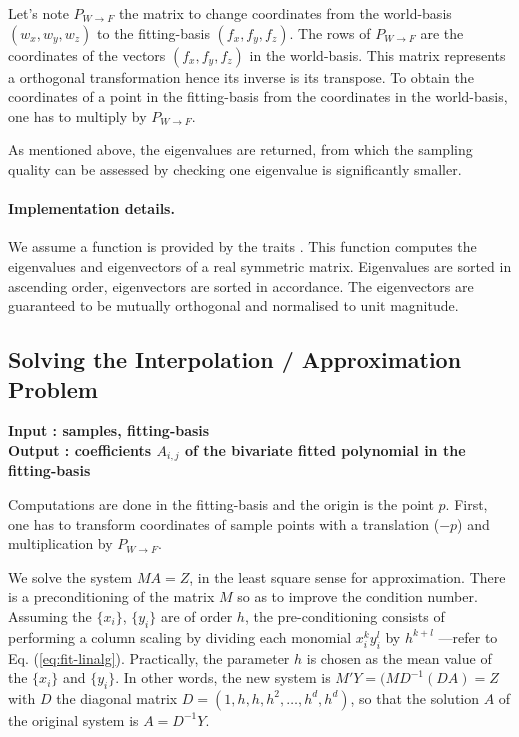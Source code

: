 Let's note $P_{W\rightarrow F}$ the matrix to change coordinates from the
world-basis $(w_x,w_y,w_z)$ to the fitting-basis $(f_x,f_y,f_z)$. The
rows of $P_{W\rightarrow F}$ are the coordinates of the vectors
$(f_x,f_y,f_z)$ in the world-basis. This matrix represents a
orthogonal transformation hence its inverse is its transpose. To obtain
the coordinates of a point in the fitting-basis from the coordinates
in the world-basis, one has to multiply by $ P_{W\rightarrow F}$.

As mentioned above, the eigenvalues are returned, from which the
sampling quality can be assessed by checking one eigenvalue is
significantly smaller.


\paragraph{Implementation details.}
We assume a  function is provided by the traits
.
This function computes the eigenvalues and eigenvectors of a real
symmetric matrix. Eigenvalues are sorted in ascending order,
eigenvectors are sorted in accordance.  The eigenvectors are
guaranteed to be mutually orthogonal and normalised to unit magnitude.

\subsection{Solving the Interpolation / Approximation Problem}
\label{sec:solving}

{\bf Input : samples, fitting-basis \\ Output : coefficients $A_{i,j}$ of the
bivariate fitted polynomial in the fitting-basis }

Computations are done in the fitting-basis and the origin is the point
$p$. First, one has to transform coordinates of sample points with a
translation ($-p$) and multiplication by $ P_{W\rightarrow F}$.


We solve the system $MA=Z$, in the least square sense for
approximation. There is a preconditioning of the matrix $M$ so as to
improve the condition number. Assuming the $\{x_i\}$, $\{y_i\}$ are of
order $h$, the pre-conditioning consists of performing a column
scaling by dividing each monomial $x_i^ky_i^l$ by $h^{k+l}$ ---refer
to Eq. (\ref{eq:fit-linalg}). Practically, the parameter $h$ is chosen
as the mean value of the $\{x_i\}$ and $\{y_i\}$. In other words, the
new system is $M'Y=(MD^{-1}(DA)=Z$ with $D$ the diagonal matrix
$D=(1,h,h,h^2,\ldots,h^d,h^d)$, so that the solution $A$ of the
original system is $A=D^{-1}Y$.

